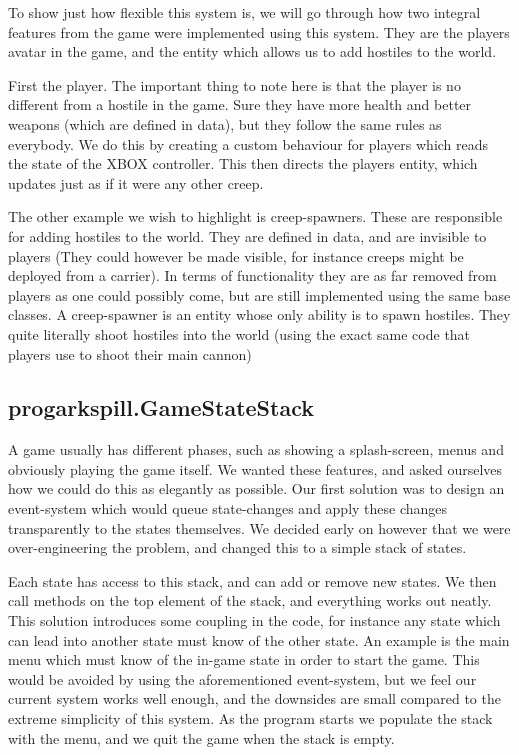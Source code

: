 To show just how flexible this system is, we will go through how two integral
features from the game were implemented using this system. They are the players
avatar in the game, and the entity which allows us to add hostiles to the 
world.

First the player. The important thing to note here is that the player is no
different from a hostile in the game. Sure they have more health and better
weapons (which are defined in data), but they follow the same rules as 
everybody. We do this by creating a custom behaviour for players which reads 
the state of the XBOX controller. This then directs the players entity, which
updates just as if it were any other creep.

The other example we wish to highlight is creep-spawners. These are responsible
for adding hostiles to the world. They are defined in data, and are invisible
to players (They could however be made visible, for instance creeps might be
deployed from a carrier). In terms of functionality they are as far removed 
from players as one could possibly come, but are still implemented using the
same base classes.  A creep-spawner is an entity whose only ability is to spawn
hostiles. They quite literally shoot hostiles into the world (using the exact
same code that players use to shoot their main cannon)

\subsection{progarkspill.GameStateStack}
A game usually has different phases, such as showing a splash-screen, menus and
obviously playing the game itself. We wanted these features, and asked 
ourselves how we could do this as elegantly as possible.  Our first solution
was to design an event-system which would queue state-changes and apply these
changes transparently to the states themselves. We decided early on however 
that we were over-engineering the problem, and changed this to a simple stack 
of states.

Each state has access to this stack, and can add or remove new states. We then
call methods on the top element of the stack, and everything works out neatly.
This solution introduces some coupling in the code, for instance any state 
which can lead into another state must know of the other state. An example is
the main menu which must know of the in-game state in order to start the game.
This would be avoided by using the aforementioned event-system, but we feel
our current system works well enough, and the downsides are small compared to
the extreme simplicity of this system. As the program starts we populate the
stack with the menu, and we quit the game when the stack is empty.

